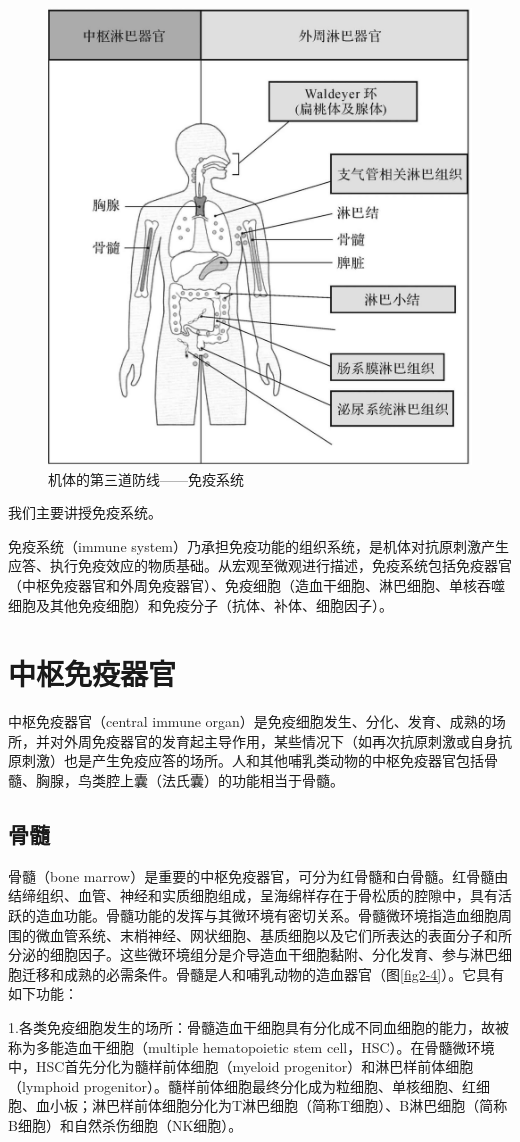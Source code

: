 \begin{figure}[!htbp]
 \centering
 \includegraphics[width=.5\textwidth]{./images/Image00028.jpg}
 \caption{机体的第三道防线------免疫系统}
 \label{fig2-3}
  \end{figure} 

我们主要讲授免疫系统。

免疫系统（immune
system）乃承担免疫功能的组织系统，是机体对抗原刺激产生应答、执行免疫效应的物质基础。从宏观至微观进行描述，免疫系统包括免疫器官（中枢免疫器官和外周免疫器官）、免疫细胞（造血干细胞、淋巴细胞、单核吞噬细胞及其他免疫细胞）和免疫分子（抗体、补体、细胞因子）。

\section{中枢免疫器官}

中枢免疫器官（central immune
organ）是免疫细胞发生、分化、发育、成熟的场所，并对外周免疫器官的发育起主导作用，某些情况下（如再次抗原刺激或自身抗原刺激）也是产生免疫应答的场所。人和其他哺乳类动物的中枢免疫器官包括骨髓、胸腺，鸟类腔上囊（法氏囊）的功能相当于骨髓。


\subsection{骨髓}

骨髓（bone
marrow）是重要的中枢免疫器官，可分为红骨髓和白骨髓。红骨髓由结缔组织、血管、神经和实质细胞组成，呈海绵样存在于骨松质的腔隙中，具有活跃的造血功能。骨髓功能的发挥与其微环境有密切关系。骨髓微环境指造血细胞周围的微血管系统、末梢神经、网状细胞、基质细胞以及它们所表达的表面分子和所分泌的细胞因子。这些微环境组分是介导造血干细胞黏附、分化发育、参与淋巴细胞迁移和成熟的必需条件。骨髓是人和哺乳动物的造血器官（图\ref{fig2-4}）。它具有如下功能：

1.各类免疫细胞发生的场所：骨髓造血干细胞具有分化成不同血细胞的能力，故被称为多能造血干细胞（multiple
hematopoietic stem
cell，HSC）。在骨髓微环境中，HSC首先分化为髓样前体细胞（myeloid
progenitor）和淋巴样前体细胞（lymphoid
progenitor）。髓样前体细胞最终分化成为粒细胞、单核细胞、红细胞、血小板；淋巴样前体细胞分化为T淋巴细胞（简称T细胞）、B淋巴细胞（简称B细胞）和自然杀伤细胞（NK细胞）。

